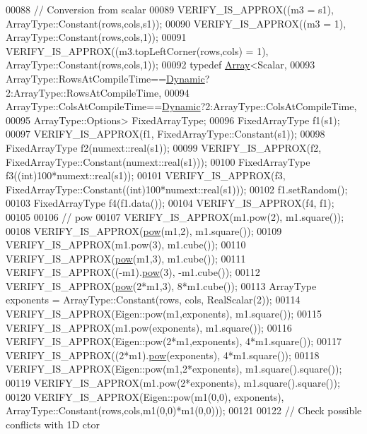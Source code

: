 \begin{DoxyCode}
00088   \textcolor{comment}{// Conversion from scalar}
00089   VERIFY\_IS\_APPROX((m3 = s1), ArrayType::Constant(rows,cols,s1));
00090   VERIFY\_IS\_APPROX((m3 = 1),  ArrayType::Constant(rows,cols,1));
00091   VERIFY\_IS\_APPROX((m3.topLeftCorner(rows,cols) = 1),  ArrayType::Constant(rows,cols,1));
00092   \textcolor{keyword}{typedef} \hyperlink{group___core___module_class_eigen_1_1_array}{Array}<Scalar,
00093                 ArrayType::RowsAtCompileTime==\hyperlink{namespace_eigen_ad81fa7195215a0ce30017dfac309f0b2}{Dynamic}?2:ArrayType::RowsAtCompileTime,
00094                 ArrayType::ColsAtCompileTime==\hyperlink{namespace_eigen_ad81fa7195215a0ce30017dfac309f0b2}{Dynamic}?2:ArrayType::ColsAtCompileTime,
00095                 ArrayType::Options> FixedArrayType;
00096   FixedArrayType f1(s1);
00097   VERIFY\_IS\_APPROX(f1, FixedArrayType::Constant(s1));
00098   FixedArrayType f2(numext::real(s1));
00099   VERIFY\_IS\_APPROX(f2, FixedArrayType::Constant(numext::real(s1)));
00100   FixedArrayType f3((\textcolor{keywordtype}{int})100*numext::real(s1));
00101   VERIFY\_IS\_APPROX(f3, FixedArrayType::Constant((\textcolor{keywordtype}{int})100*numext::real(s1)));
00102   f1.setRandom();
00103   FixedArrayType f4(f1.data());
00104   VERIFY\_IS\_APPROX(f4, f1);
00105   
00106   \textcolor{comment}{// pow}
00107   VERIFY\_IS\_APPROX(m1.pow(2), m1.square());
00108   VERIFY\_IS\_APPROX(\hyperlink{group___core___module_ab6dc101d82e8228a19a8840e3a29c1c9}{pow}(m1,2), m1.square());
00109   VERIFY\_IS\_APPROX(m1.pow(3), m1.cube());
00110   VERIFY\_IS\_APPROX(\hyperlink{group___core___module_ab6dc101d82e8228a19a8840e3a29c1c9}{pow}(m1,3), m1.cube());
00111   VERIFY\_IS\_APPROX((-m1).\hyperlink{group___core___module_ab6dc101d82e8228a19a8840e3a29c1c9}{pow}(3), -m1.cube());
00112   VERIFY\_IS\_APPROX(\hyperlink{group___core___module_ab6dc101d82e8228a19a8840e3a29c1c9}{pow}(2*m1,3), 8*m1.cube());
00113   ArrayType exponents = ArrayType::Constant(rows, cols, RealScalar(2));
00114   VERIFY\_IS\_APPROX(Eigen::pow(m1,exponents), m1.square());
00115   VERIFY\_IS\_APPROX(m1.pow(exponents), m1.square());
00116   VERIFY\_IS\_APPROX(Eigen::pow(2*m1,exponents), 4*m1.square());
00117   VERIFY\_IS\_APPROX((2*m1).\hyperlink{group___core___module_ab6dc101d82e8228a19a8840e3a29c1c9}{pow}(exponents), 4*m1.square());
00118   VERIFY\_IS\_APPROX(Eigen::pow(m1,2*exponents), m1.square().square());
00119   VERIFY\_IS\_APPROX(m1.pow(2*exponents), m1.square().square());
00120   VERIFY\_IS\_APPROX(Eigen::pow(m1(0,0), exponents), ArrayType::Constant(rows,cols,m1(0,0)*m1(0,0)));
00121 
00122   \textcolor{comment}{// Check possible conflicts with 1D ctor}

\end{DoxyCode}
